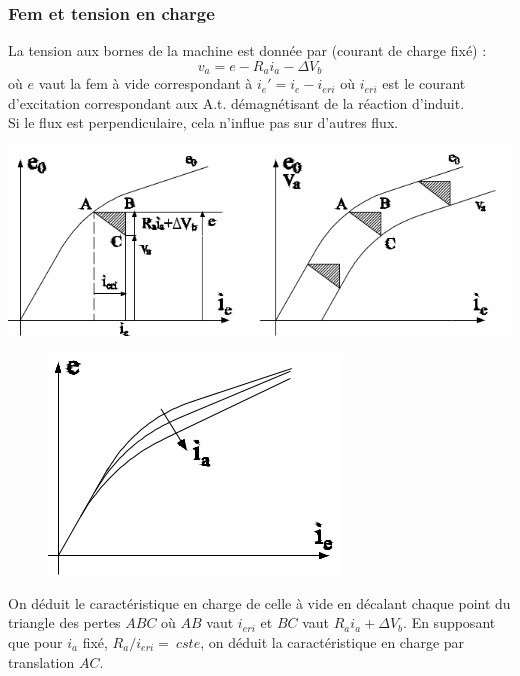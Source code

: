 		
		\subsubsection{Fem et tension en charge}
		La tension aux bornes de la machine est donnée par (courant de charge fixé) :
		\begin{equation}
		v_a = e - R_ai_a - \Delta V_b
		\end{equation}
		où $e$ vaut la fem à vide correspondant à $i_e' = i_e-i_{eri}$ où $i_{eri}$ 
		est le courant d’excitation correspondant aux A.t. démagnétisant de la réaction 
		d'induit.\\
		\danger Si le flux est perpendiculaire, cela n'influe pas sur d'autres flux.\\
		\newpage

		\begin{center}
		\includegraphics[scale=0.43]{ch4/image19.png}
		\end{center}		
		
		\begin{figure}
		\includegraphics[scale=0.34]{ch4/image20.png}
		\end{figure}
		On déduit le caractéristique en charge de celle à vide en décalant chaque 
		point du triangle des pertes $ABC$ où $AB$ vaut $i_{eri}$ et $BC$ vaut 
		$R_ai_a + \Delta V_b$. En supposant que pour $i_a$ fixé, $R_a/i_{eri} =\ cste$, 
		on déduit la caractéristique en charge par translation $AC$.\\
				
